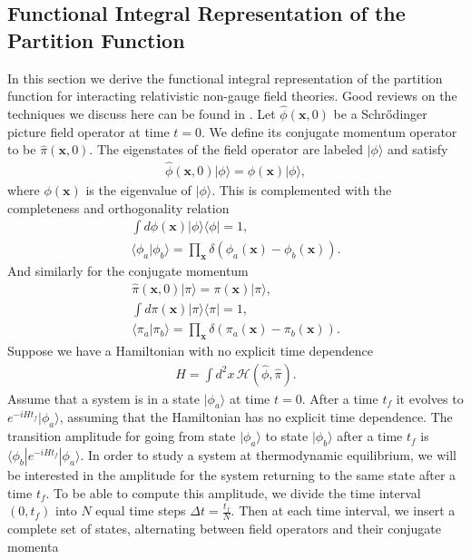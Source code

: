         \subsection{Functional Integral Representation of the Partition Function}
        In this section we derive the functional integral representation of the partition function for interacting relativistic non-gauge field theories. Good reviews on the techniques we discuss here can be found in \cite{Laine:2016hma, 0486477223}.
        Let $\hat{\phi}(\bm{x},0)$ be a Schr{\H o}dinger picture field operator at time $t=0$. We define its conjugate momentum operator to be $\hat{\pi}(\bm{x},0)$. The eigenstates of the field operator are labeled $| \phi \rangle$ and satisfy
        \begin{align}
            \hat{\phi}(\bm{x},0) | \phi \rangle = \phi(\bm{x}) | \phi \rangle,
        \end{align}
        where $\phi(\bm{x})$ is the eigenvalue of $| \phi \rangle$. This is complemented with the completeness and orthogonality relation
        \begin{align}
            \int d \phi(\bm{x}) | \phi \rangle \langle \phi | = 1, \\
            \langle \phi_a | \phi_b \rangle = \prod_{\bm{x}} \delta(\phi_a(\bm{x}) - \phi_b(\bm{x})).
        \end{align}
        And similarly for the conjugate momentum
        \begin{align}
            \hat{\pi}(\bm{x},0) | \pi \rangle = \pi(\bm{x}) | \pi \rangle, \\
            \int d \pi(\bm{x}) | \pi \rangle \langle \pi | = 1, \\
            \langle \pi_a | \pi_b \rangle = \prod_{\bm{x}} \delta(\pi_a(\bm{x}) - \pi_b(\bm{x})).
        \end{align}
        Suppose we have a Hamiltonian with no explicit time dependence
        \begin{align}
            H = \int d^2x \, \mathcal{H}(\hat{\phi}, \hat{\pi}).
        \end{align}
        Assume that a system is in a state $| \phi_a \rangle$ at time $t=0$. After a time $t_f$ it evolves to $e^{-i H t_f} | \phi_a \rangle$, assuming that the Hamiltonian has no explicit time dependence. The transition amplitude for going from state $| \phi_a \rangle$ to state $| \phi_b \rangle$ after a time $t_f$ is $\langle \phi_b | e^{-i H t_f} | \phi_a \rangle$. In order to study a system at thermodynamic equilibrium, we will be interested in the amplitude for the system returning to the same state after a time $t_f$. To be able to compute this amplitude, we divide the time interval $(0, t_f)$ into $N$ equal time steps $\Delta t = \frac{t_f}{N}$. Then at each time interval, we insert a complete set of states, alternating between field operators and their conjugate momenta


